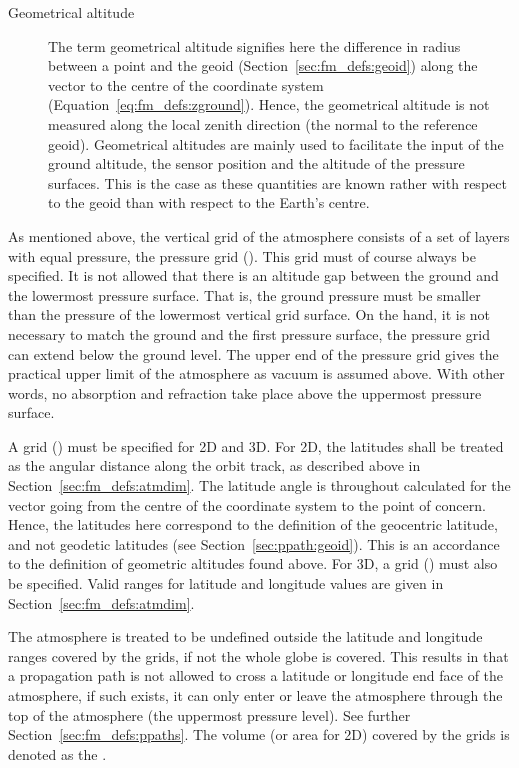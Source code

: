 \begin{description}
\item[Geometrical altitude] The term
  geometrical altitude signifies here the difference in radius between
  a point and the geoid (Section~\ref{sec:fm_defs:geoid}) along the
  vector to the centre of the coordinate system
  (Equation~\ref{eq:fm_defs:zground}). Hence, the geometrical altitude
  is not measured along the local zenith direction (the normal to the
  reference geoid). Geometrical altitudes are mainly used to
  facilitate the input of the ground altitude, the sensor position and
  the altitude of the pressure surfaces. This is the case as these
  quantities are known rather with respect to the geoid than with
  respect to the Earth's centre.

\end{description}


\label{sec:fm_defs:grids}

As mentioned above, the vertical grid of the atmosphere consists of a
set of layers with equal pressure, the pressure grid ().
This grid must of course always be specified. It is not allowed that
there is an altitude gap between the ground and the lowermost pressure
surface.  That is, the ground pressure must be smaller than the
pressure of the lowermost vertical grid surface. On the hand, it is
not necessary to match the ground and the first pressure surface, the
pressure grid can extend below the ground level. The upper end of the
pressure grid gives the practical upper limit of the atmosphere as
vacuum is assumed above. With other words, no absorption and
refraction take place above the uppermost pressure surface.

A  grid () must be specified
for 2D and 3D.  For 2D, the latitudes shall be treated as the angular
distance along the orbit track, as described above in
Section~\ref{sec:fm_defs:atmdim}.  The latitude angle is throughout
calculated for the vector going from the centre of the coordinate
system to the point of concern. Hence, the latitudes here correspond
to the definition of the geocentric latitude, and not geodetic
latitudes (see Section~\ref{sec:ppath:geoid}). This is an accordance
to the definition of geometric altitudes found above.  For 3D, a
 grid () must also be specified.
Valid ranges for latitude and longitude values are given in
Section~\ref{sec:fm_defs:atmdim}.

The atmosphere is treated to be undefined outside the latitude and
longitude ranges covered by the grids, if not the whole globe is
covered. This results in that a propagation path is not allowed to
cross a latitude or longitude end face of the atmosphere, if such
exists, it can only enter or leave the atmosphere through the top of
the atmosphere (the uppermost pressure level). See further
Section~\ref{sec:fm_defs:ppaths}. The volume (or area for 2D) covered
by the grids is denoted as the .

